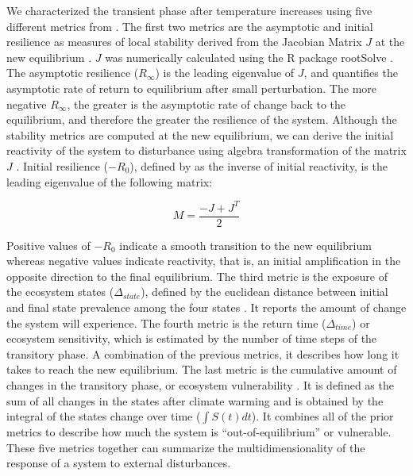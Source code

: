 We characterized the transient phase after temperature increases using
five different metrics from \citet{Boulangeat2018}. The first two
metrics are the asymptotic and initial resilience as measures of local
stability derived from the Jacobian Matrix \(J\) at the new equilibrium
\citep{Arnoldi2016}. \(J\) was numerically calculated using the R
package rootSolve \citep{Soetaert2009, Soetaert2009a}. The asymptotic
resilience (\(R_{\infty}\)) is the leading eigenvalue of \(J\), and
quantifies the asymptotic rate of return to equilibrium after small
perturbation. The more negative \(R_{\infty}\), the greater is the
asymptotic rate of change back to the equilibrium, and therefore the
greater the resilience of the system. Although the stability metrics are
computed at the new equilibrium, we can derive the initial reactivity of
the system to disturbance using algebra transformation of the matrix
\(J\) \citep{Neubert1997}. Initial resilience (\(-R_0\)), defined by
\citet{Arnoldi2016} as the inverse of initial reactivity, is the leading
eigenvalue of the following matrix:

\[
M = \frac{-J + J^T}{2}
\]

Positive values of \(-R_0\) indicate a smooth transition to the new
equilibrium whereas negative values indicate reactivity, that is, an
initial amplification in the opposite direction to the final
equilibrium. The third metric is the exposure of the ecosystem states
(\(\Delta_{state}\)), defined by the euclidean distance between initial
and final state prevalence among the four states \citep{Dawson2011}. It
reports the amount of change the system will experience. The fourth
metric is the return time (\(\Delta_{time}\)) or ecosystem sensitivity,
which is estimated by the number of time steps of the transitory phase.
A combination of the previous metrics, it describes how long it takes to
reach the new equilibrium. The last metric is the cumulative amount of
changes in the transitory phase, or ecosystem vulnerability
\citep{Boulangeat2018}. It is defined as the sum of all changes in the
states after climate warming and is obtained by the integral of the
states change over time (\(\int S(t)dt\)). It combines all of the prior
metrics to describe how much the system is ``out-of-equilibrium'' or
vulnerable. These five metrics together can summarize the
multidimensionality of the response of a system to external
disturbances.

